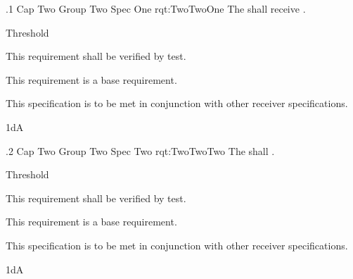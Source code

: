 \ONERQMTV
{\RqtNumberBase.1}
{Cap Two Group Two Spec One}
{rqt:TwoTwoOne}
{The \ThisSys{} shall receive \TBD.}
{
	\item [Phase 1] Threshold
}
{This requirement shall be verified by test.}
{
	\item [N/A] This requirement is a base requirement.
}
{
	\item This specification is to be met in conjunction with other receiver specifications.
}
{1dA}

\ONERQMTV
{\RqtNumberBase.2}
{Cap Two Group Two Spec Two}
{rqt:TwoTwoTwo}
{The \ThisSys{} shall \TBD.}
{
	\item [Phase 1] Threshold
}
{This requirement shall be verified by test.}
{
	\item [N/A] This requirement is a base requirement.
}
{
	\item This specification is to be met in conjunction with other receiver specifications.
}
{1dA}
